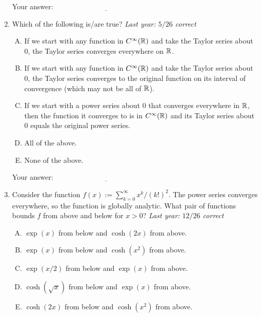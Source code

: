 \documentclass[10pt]{amsart}
\begin{document}
\begin{enumerate}
  \vspace{0.1in}
  Your answer: $\underline{\qquad\qquad\qquad\qquad\qquad\qquad\qquad}$
  \vspace{0.15in}

\item Which of the following is/are true? {\em Last year: $5/26$ correct}

  \begin{enumerate}[(A)]
  \item If we start with any function in $C^\infty(\mathbb{R})$ and take the
    Taylor series about $0$, the Taylor series converges everywhere on
    $\mathbb{R}$.
  \item If we start with any function in $C^\infty(\mathbb{R})$ and take the
    Taylor series about $0$, the Taylor series converges to the
    original function on its interval of convergence (which may not be
    all of $\mathbb{R}$).
  \item If we start with a power series about $0$ that converges
    everywhere in $\mathbb{R}$, then the function it converges to is in
    $C^\infty(\mathbb{R})$ and its Taylor series about $0$ equals the original
    power series.
  \item All of the above.
  \item None of the above.
  \end{enumerate}

  \vspace{0.1in}
  Your answer: $\underline{\qquad\qquad\qquad\qquad\qquad\qquad\qquad}$
  \vspace{0.15in}

\item Consider the function $f(x) := \sum_{k=0}^\infty
  x^k/(k!)^2$. The power series converges everywhere, so the function
  is globally analytic. What pair of functions bounds $f$ from above
  and below for $x > 0$? {\em Last year: $12/26$ correct}

  \begin{enumerate}[(A)]
  \item $\exp(x)$ from below and $\cosh(2x)$ from above.
  \item $\exp(x)$ from below and $\cosh(x^2)$ from above.
  \item $\exp(x/2)$ from below and $\exp(x)$ from above.
  \item $\cosh(\sqrt{x})$ from below and $\exp(x)$ from above.
  \item $\cosh(2x)$ from below and $\cosh(x^2)$ from above.
  \end{enumerate}


\end{enumerate}
\end{document}
